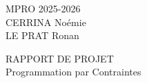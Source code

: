 \documentclass[class=article, crop=false]{standalone}
\begin{document}
\thispagestyle{plain}
\renewcommand{\footrulewidth}{0.4pt}
\renewcommand{\headrulewidth}{0.4pt}

\setlength{\parindent}{0pt}

\large
MPRO 2025-2026\\[0.25cm]
CERRINA Noémie\\[0.25cm]
LE PRAT Ronan

\vfill


\begin{center}
    \LARGE
    RAPPORT DE PROJET\\[0.7cm]
    \LARGE
    Programmation par Contraintes\\[0.7cm]
    \normalsize
\end{center}

\vfill
\end{document}
